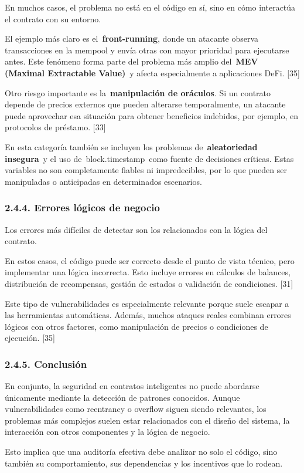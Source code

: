 En muchos casos, el problema no está en el código en sí, sino en cómo
interactúa el contrato con su entorno.

El ejemplo más claro es el~\textbf{front-running}, donde un atacante
observa transacciones en la mempool y envía otras con mayor prioridad
para ejecutarse antes. Este fenómeno forma parte del problema más amplio
del~\textbf{MEV (Maximal Extractable Value)}~y afecta especialmente a
aplicaciones DeFi. {[}35{]}

Otro riesgo importante es la~\textbf{manipulación de oráculos}. Si un
contrato depende de precios externos que pueden alterarse temporalmente,
un atacante puede aprovechar esa situación para obtener beneficios
indebidos, por ejemplo, en protocolos de préstamo. {[}33{]}

En esta categoría también se incluyen los problemas
de~\textbf{aleatoriedad insegura}~y el uso de~block.timestamp~como
fuente de decisiones críticas. Estas variables no son completamente
fiables ni impredecibles, por lo que pueden ser manipuladas o
anticipadas en determinados escenarios.

\subsubsection{2.4.4. Errores lógicos de
negocio}\label{errores-luxf3gicos-de-negocio}

Los errores más difíciles de detectar son los relacionados con la lógica
del contrato.

En estos casos, el código puede ser correcto desde el punto de vista
técnico, pero implementar una lógica incorrecta. Esto incluye errores en
cálculos de balances, distribución de recompensas, gestión de estados o
validación de condiciones. {[}31{]}

Este tipo de vulnerabilidades es especialmente relevante porque suele
escapar a las herramientas automáticas. Además, muchos ataques reales
combinan errores lógicos con otros factores, como manipulación de
precios o condiciones de ejecución. {[}35{]}

\subsubsection{2.4.5. Conclusión}\label{conclusiuxf3n}

En conjunto, la seguridad en contratos inteligentes no puede abordarse
únicamente mediante la detección de patrones conocidos. Aunque
vulnerabilidades como reentrancy o overflow siguen siendo relevantes,
los problemas más complejos suelen estar relacionados con el diseño del
sistema, la interacción con otros componentes y la lógica de negocio.

Esto implica que una auditoría efectiva debe analizar no solo el código,
sino también su comportamiento, sus dependencias y los incentivos que lo
rodean.
